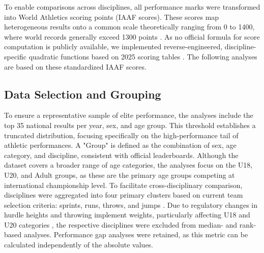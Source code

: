 To enable comparisons across disciplines, all performance marks were transformed into World Athletics scoring points (IAAF scores). These scores map heterogeneous results onto a common scale theoretically ranging from 0 to 1400, where world records generally exceed 1300 points \citep{WorldAthleticsTechnical}. As no official formula for score computation is publicly available, we implemented reverse-engineered, discipline-specific quadratic functions based on 2025 scoring tables \citep{chen_iaaf}. The following analyses are based on these standardized IAAF scores.

\subsection{Data Selection and Grouping}
To ensure a representative sample of elite performance, the analyses include the top 35 national results per year, sex, and age group. This threshold establishes a truncated distribution, focusing specifically on the high-performance tail of athletic performances. A "Group" is defined as the combination of sex, age category, and discipline, consistent with official leaderboards. Although the dataset covers a broader range of age categories, the analyses focus on the U18, U20, and Adult groups, as these are the primary age groups competing at international championship level. To facilitate cross-disciplinary comparison, disciplines were aggregated into four primary clusters based on current team selection criteria: sprints, runs, throws, and jumps \citep{DLVKaderbildungsrichtlinienUndNormen2025}. Due to regulatory changes in hurdle heights and throwing implement weights, particularly affecting U18 and U20 categories \citep{ProgressionWorldAthletics}, the respective disciplines were excluded from median- and rank-based analyses. Performance gap analyses were retained, as this metric can be calculated independently of the absolute values.

